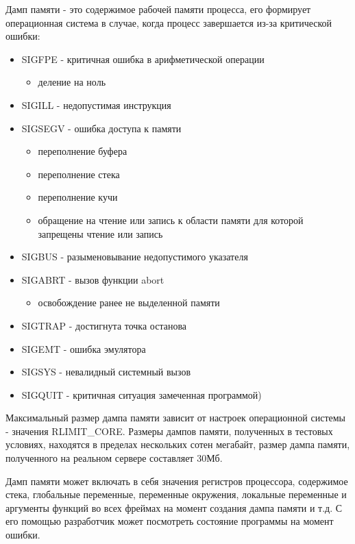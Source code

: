\documentclass[20pt]{article}
\begin{document}
Дамп памяти\cite{wiki/coredump} - это содержимое рабочей памяти процесса, его
формирует операционная система в случае, когда процесс завершается из-за
критической ошибки\cite{core-dump-signals}\cite{error-types}:
\begin{itemize}
  \item SIGFPE - критичная ошибка в арифметической операции
  \begin{itemize}
    \item деление на ноль
  \end{itemize}
  \item SIGILL - недопустимая инструкция
  \item SIGSEGV - ошибка доступа к памяти
    \begin{itemize}
      \item переполнение буфера\cite{buffer-overflow}
      \item переполнение стека\cite{stack-overflow}
      \item переполнение кучи\cite{heap-overflow}
      \item обращение на чтение или запись к области памяти для которой запрещены
      чтение или запись\cite{memory-corruption}
    \end{itemize}
  \item SIGBUS - разыменовывание недопустимого указателя
  \item SIGABRT - вызов функции abort
    \begin{itemize}
      \item освобождение ранее не выделенной памяти
    \end{itemize}
  \item SIGTRAP - достигнута точка останова
  \item SIGEMT - ошибка эмулятора
  \item SIGSYS - невалидный системный вызов
  \item SIGQUIT - критичная ситуация замеченная программой)\cite{sigquit}
\end{itemize}

Максимальный размер дампа памяти зависит от настроек операционной системы -
значения RLIMIT\_CORE. Размеры дампов памяти, полученных в тестовых условиях,
находятся в пределах нескольких сотен мегабайт, размер дампа памяти, полученного
на реальном сервере составляет 30Мб.

Дамп памяти может включать в себя значения регистров процессора, содержимое стека,
глобальные переменные, переменные окружения, локальные переменные и аргументы
функций во всех фреймах на момент создания дампа памяти и т.д. С его помощью
разработчик может посмотреть состояние программы на момент ошибки.
\end{document}

